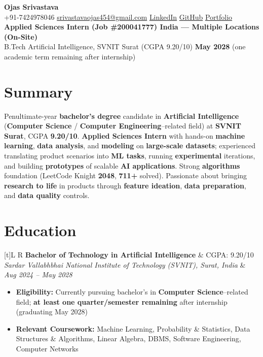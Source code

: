 \documentclass[a4paper,10pt]{article}
\newcommand{\resumeSubheading}[4]{%
  \vspace{0.5mm}
  \noindent
  \begin{tabularx}{\textwidth}[t]{L R}
    \textbf{#1} & #4 \\
    \textit{#3} & \textit{#2} \\
  \end{tabularx}
  \vspace{-0.5mm}%
}
\begin{document}
\selectfont

\begin{center}
  {\LARGE \textbf{Ojas Srivastava}} \\[1mm]
  \small
  +91-7424978046 \textbar{}
  \href{mailto:srivastavaojas454@gmail.com}{srivastavaojas454@gmail.com} \textbar{}
  \href{https://linkedin.com/in/ojas-srivastava05}{LinkedIn} \textbar{}
  \href{https://github.com/Ojas-Srivastava05}{GitHub} \textbar{}
  \href{https://ojas-srivastava.vercel.app}{Portfolio} \\[0.5mm]
  \textbf{Applied Sciences Intern (Job \#200041777) \textbar{} India --- Multiple Locations (On-Site)} \\[0.3mm]
  B.Tech Artificial Intelligence, SVNIT Surat (CGPA 9.20/10) \textbar{}
  \textbf{May 2028} (one academic term remaining after internship)
\end{center}

\vspace{-1mm}

\section{Summary}
\small
Penultimate-year \textbf{bachelor's degree} candidate in \textbf{Artificial Intelligence} (\textbf{Computer Science} / \textbf{Computer Engineering}--related field) at \textbf{SVNIT Surat}, CGPA \textbf{9.20/10}. \textbf{Applied Sciences Intern} with hands-on \textbf{machine learning}, \textbf{data analysis}, and \textbf{modeling} on \textbf{large-scale datasets}; experienced translating product scenarios into \textbf{ML tasks}, running \textbf{experimental} iterations, and building \textbf{prototypes} of scalable \textbf{AI applications}. Strong \textbf{algorithms} foundation (LeetCode Knight \textbf{2048}, \textbf{711+} solved). Passionate about bringing \textbf{research to life} in products through \textbf{feature ideation}, \textbf{data preparation}, and \textbf{data quality} controls.

\section{Education}
\small
\resumeSubheading
  {Bachelor of Technology in Artificial Intelligence}{Aug 2024 -- May 2028}
  {Sardar Vallabhbhai National Institute of Technology (SVNIT), Surat, India}{CGPA: 9.20/10}
\begin{itemize}
  \item \textbf{Eligibility:} Currently pursuing bachelor's in \textbf{Computer Science}--related field; \textbf{at least one quarter/semester remaining} after internship (graduating May 2028)
  \item \textbf{Relevant Coursework:} Machine Learning, Probability \& Statistics, Data Structures \& Algorithms, Linear Algebra, DBMS, Software Engineering, Computer Networks
\end{itemize}
\end{document}
